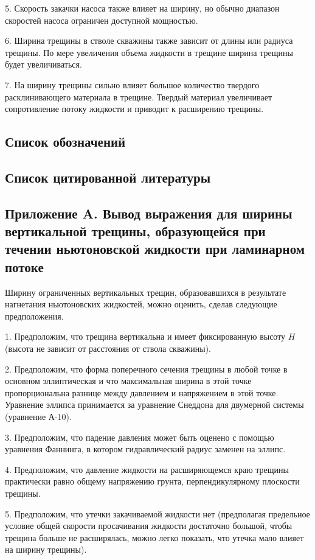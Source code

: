 \documentclass[a4paper, 12pt]{article}
\begin{document}
5. Скорость закачки насоса также влияет на ширину, но обычно диапазон скоростей насоса ограничен доступной мощностью.

6. Ширина трещины в стволе скважины также зависит от длины или радиуса трещины.
По мере увеличения объема жидкости в трещине ширина трещины будет увеличиваться.

7. На ширину трещины сильно влияет большое количество твердого расклинивающего материала в трещине.
Твердый материал увеличивает сопротивление потоку жидкости и приводит к расширению трещины.

\subsection{Список обозначений}

\subsection{Список цитированной литературы}

\subsection{Приложение A. Вывод выражения для ширины вертикальной трещины, образующейся при течении ньютоновской жидкости при ламинарном потоке}

Ширину ограниченных вертикальных трещин, образовавшихся в результате нагнетания ньютоновских жидкостей, можно оценить, сделав следующие предположения.

1. Предположим, что трещина вертикальна и имеет фиксированную высоту $H$ (высота не зависит от расстояния от ствола скважины).

2. Предположим, что форма поперечного сечения трещины в любой точке в основном эллиптическая и что максимальная ширина в этой точке пропорциональна разнице между давлением и напряжением в этой точке.
Уравнение эллипса принимается за уравнение Снеддона для двумерной системы (уравнение А-10).

3. Предположим, что падение давления может быть оценено с помощью уравнения Фаннинга, в котором гидравлический радиус заменен на эллипс.

4. Предположим, что давление жидкости на расширяющемся краю трещины практически равно общему напряжению грунта, перпендикулярному плоскости трещины.

5. Предположим, что утечки закачиваемой жидкости нет (предполагая предельное условие общей скорости просачивания жидкости достаточно большой, чтобы трещина больше не расширялась, можно легко показать, что утечка мало влияет на ширину трещины).
\end{document}
